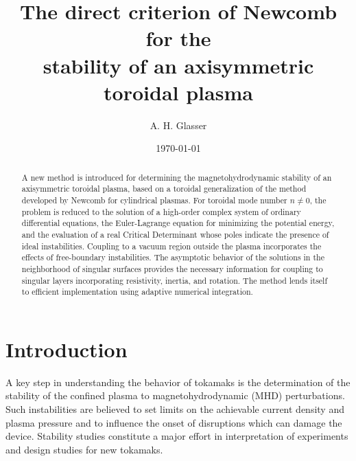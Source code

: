 \documentclass[prb,twocolumn,showpacs,preprintnumbers,amsmath,amssymb]{revtex4}
\begin{document}
\title{The direct criterion of Newcomb for the \\ stability of an
axisymmetric toroidal plasma} 

\author{A. H. Glasser}

\date{\today}

\begin{abstract}
A new method is introduced for determining the magnetohydrodynamic
stability of an axisymmetric toroidal plasma, based on a toroidal
generalization of the method developed by Newcomb for cylindrical
plasmas.  For toroidal mode number $n \ne 0$, the problem is reduced to
the solution of a high-order complex system of ordinary differential
equations, the Euler-Lagrange equation for minimizing the potential
energy, and the evaluation of a real Critical Determinant whose poles
indicate the presence of ideal instabilities.  Coupling to a vacuum
region outside the plasma incorporates the effects of free-boundary
instabilities.  The asymptotic behavior of the solutions in the
neighborhood of singular surfaces provides the necessary information for
coupling to singular layers incorporating resistivity, inertia, and
rotation.  The method lends itself to efficient implementation using
adaptive numerical integration.
\end{abstract}


\maketitle

\section{\label{sec:intro}Introduction}

A key step in understanding the behavior of tokamaks is the
determination of the stability of the confined plasma to
magnetohydrodynamic (MHD) perturbations.  Such instabilities are
believed to set limits on the achievable current density and plasma
pressure and to influence the onset of disruptions which can damage the
device.  Stability studies constitute a major effort in interpretation
of experiments and design studies for new tokamaks.
\end{document}
